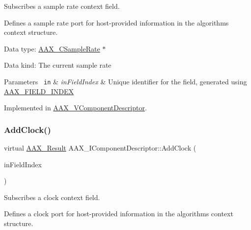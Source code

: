 Subscribes a sample rate context field. 

Defines a sample rate port for host-\/provided information in the algorithm\textquotesingle{}s context structure.


\begin{DoxyItemize}
\item Data type\+: \mbox{\hyperlink{a00392_a3d9eea08f47e0b0a23432e15baa4e885}{A\+A\+X\+\_\+\+C\+Sample\+Rate}} $\ast$
\item Data kind\+: The current sample rate
\end{DoxyItemize}


\begin{DoxyParams}[1]{Parameters}
\mbox{\texttt{ in}}  & {\em in\+Field\+Index} & Unique identifier for the field, generated using \mbox{\hyperlink{a00392_acf807247ecd6e5899dc9dc31644e9a1d}{A\+A\+X\+\_\+\+F\+I\+E\+L\+D\+\_\+\+I\+N\+D\+EX}} \\
\hline
\end{DoxyParams}


Implemented in \mbox{\hyperlink{a01901_a7c69cb309caba10c00e43df147697e98}{A\+A\+X\+\_\+\+V\+Component\+Descriptor}}.

\mbox{\label{a01781_a59727dee1043fcd7f14da130ab254445}} 
\subsubsection{\texorpdfstring{AddClock()}{AddClock()}}
{\footnotesize\ttfamily virtual \mbox{\hyperlink{a00392_a4d8f69a697df7f70c3a8e9b8ee130d2f}{A\+A\+X\+\_\+\+Result}} A\+A\+X\+\_\+\+I\+Component\+Descriptor\+::\+Add\+Clock (\begin{DoxyParamCaption}\item[{\mbox{\hyperlink{a00392_ae807f8986143820cfb5d6da32165c9c7}{A\+A\+X\+\_\+\+C\+Field\+Index}}}]{in\+Field\+Index }\end{DoxyParamCaption})\hspace{0.3cm}{\ttfamily [pure virtual]}}



Subscribes a clock context field. 

Defines a clock port for host-\/provided information in the algorithm\textquotesingle{}s context structure.


